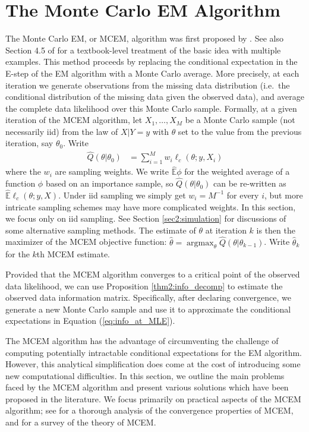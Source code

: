 \documentclass[11pt, oneside]{article}   	%
\newcommand{\bE}{\mathbb{E}}
\DeclareMathOperator*{\argmax}{argmax}
\begin{document}
\section{The Monte Carlo EM Algorithm}
\label{sec2:MCEM}

The Monte Carlo EM, or MCEM, algorithm was first proposed by \citet{Wei90}. See also Section 4.5 of \citet{Tan96} for a textbook-level treatment of the basic idea with multiple examples. This method proceeds by replacing the conditional expectation in the E-step of the EM algorithm with a Monte Carlo average. More precisely, at each iteration we generate observations from the missing data distribution (i.e.\ the conditional distribution of the missing data given the observed data), and average the complete data likelihood over this Monte Carlo sample. Formally, at a given iteration of the MCEM algorithm, let $X_1,\ldots, X_M$ be a Monte Carlo sample (not necessarily iid) from the law of $X|Y=y$ with $\theta$ set to the value from the previous iteration, say $\theta_0$. Write
%
\begin{align}
    \hat{Q}(\theta|\theta_0) &= \sum_{i=1}^M w_i \ell_c(\theta; y, X_i) \label{eq:MCEM_objective}
\end{align}
%
where the $w_i$ are sampling weights. We write $\hat{\bE} \phi$ \index{$\hat{\bE}$} for the weighted average of a function $\phi$ based on an importance sample, so $\hat{Q}(\theta|\theta_0)$ can be re-written as $\hat{\bE} \ell_c (\theta; y, X)$. Under iid sampling we simply get $w_i = M^{-1}$ for every $i$, but more intricate sampling schemes may have more complicated weights. In this section, we focus only on iid sampling. See Section \ref{sec2:simulation} for discussions of some alternative sampling methods. The estimate of $\theta$ at iteration $k$ is then the maximizer of the MCEM objective function: $\hat{\theta} = \argmax_\theta \hat{Q}(\theta|\theta_{k-1})$. Write $\hat{\theta}_{k}$ for the $k$th MCEM estimate. 

Provided that the MCEM algorithm converges to a critical point of the observed data likelihood, we can use Proposition \ref{thm2:info_decomp} to estimate the observed data information matrix. Specifically, after declaring convergence, we generate a new Monte Carlo sample and use it to approximate the conditional expectations in Equation (\ref{eq:info_at_MLE}).

The MCEM algorithm has the advantage of circumventing the challenge of computing potentially intractable conditional expectations for the EM algorithm. However, this analytical simplification does come at the cost of introducing some new computational difficulties. In this section, we outline the main problems faced by the MCEM algorithm and present various solutions which have been proposed in the literature. We focus primarily on practical aspects of the MCEM algorithm; see \citet{For03} for a thorough analysis of the convergence properties of MCEM, and \citet{Nea13} for a survey of the theory of MCEM.
\end{document}
